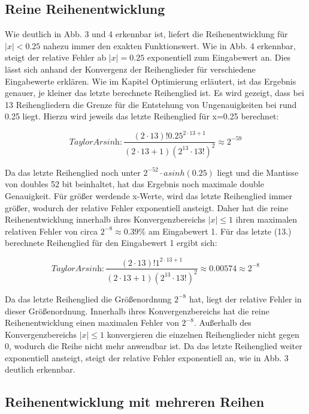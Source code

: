 \documentclass[course=erap] {aspdoc}
\begin{document}
    \subsection{Reine Reihenentwicklung}\label{subsec:reine-reihenentwicklung}
    Wie deutlich in Abb. 3 und 4 erkennbar ist, liefert die Reihenentwicklung für $|x|<0.25$ nahezu immer den exakten Funktionswert.
    Wie in Abb. 4 erkennbar, steigt der relative Fehler ab $|x| = 0.25$ exponentiell zum Eingabewert an.
    Dies lässt sich anhand der Konvergenz der Reihenglieder für verschiedene Eingabewerte erklären.
    Wie im Kapitel Optimierung erläutert, ist das Ergebnis genauer, je kleiner das letzte berechnete Reihenglied ist.
    Es wird gezeigt, dass bei 13 Reihengliedern die Grenze für die Entstehung von Ungenauigkeiten bei rund 0.25 liegt.
    Hierzu wird jeweils das letzte Reihenglied für x=0.25 berechnet:

    \[
        \textit{TaylorArsinh}: \frac{(2\cdot13)!0.25^{2\cdot13 + 1}}{(2\cdot13 + 1)(2^13\cdot13!)^2} \approx 2^{-59}
    \]

    Da das letzte Reihenglied noch unter $2^{-52}\cdot asinh(0.25)$ liegt und die Mantisse von doubles 52 bit beinhaltet, hat das Ergebnis noch maximale double Genauigkeit.
    Für größer werdende x-Werte, wird das letzte Reihenglied immer größer, wodurch der relative Fehler exponentiell ansteigt.
    Daher hat die reine Reihenentwicklung innerhalb ihres Konvergenzbereichs $|x|\leq1$ ihren maximalen relativen Fehler von circa $2^{-8} \approx 0.39\%$ am Eingabewert 1.
    Für das letzte (13.) berechnete Reihenglied für den Eingabewert 1 ergibt sich:

    \[
        \textit{TaylorArsinh}: \frac{(2\cdot13)!1^{2\cdot13 + 1}}{(2\cdot13 + 1)(2^13\cdot13!)^2} \approx 0.00574 \approx 2^{-8}
    \]

    Da das letzte Reihenglied die Größenordnung $2^{-8}$ hat, liegt der relative Fehler in dieser Größenordnung.
    Innerhalb ihres Konvergenzbereichs hat die reine Reihenentwicklung einen maximalen Fehler von $2^{-8}$.
    Außerhalb des Konvergenzbereichs $|x|\leq1$ konvergieren die einzelnen Reihenglieder nicht gegen 0, wodurch die Reihe nicht mehr anwendbar ist.
    Da das letzte Reihenglied weiter exponentiell ansteigt, steigt der relative Fehler exponentiell an, wie in Abb. 3 deutlich erkennbar.

    \subsection{Reihenentwicklung mit mehreren Reihen}\label{subsec:reihenentwicklung-mit-mehreren-reihen}
\end{document}
